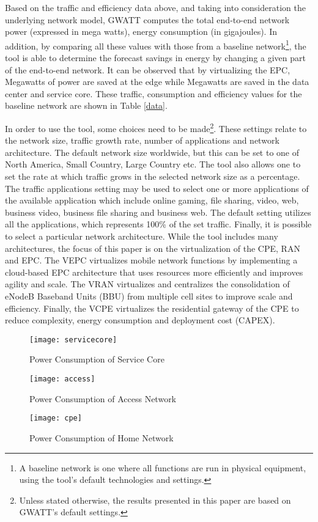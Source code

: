 \documentclass[conference]{IEEEtran}
\begin{document}
Based on the traffic and efficiency data above, and taking into consideration the underlying network model, GWATT computes the total end-to-end network power (expressed in mega watts), energy consumption (in gigajoules). In addition, by comparing all these values with those from a baseline network\footnote{A baseline network is one where all functions are run in physical equipment, using the tool's default technologies and settings.}, the tool is able to determine the forecast savings in energy by changing a given part of the end-to-end network. It can be observed that by virtualizing the EPC,  Megawatts of power are saved at the edge while  Megawatts are saved in the data center and service core. These traffic, consumption and efficiency values for the baseline network are shown in Table \ref{data}.

In order to use the tool, some choices need to be made\footnote{Unless stated otherwise, the results presented in this paper are based on GWATT's default settings.}. These settings relate to the network size, traffic growth rate, number of applications and network architecture. The default network size worldwide, but this can be set to one of North America, Small Country, Large Country etc. The tool also allows one to set the rate at which traffic grows in the selected network size as a percentage. The traffic applications setting may be used to select one or more applications of the available application which include online gaming, file sharing, video, web, business video, business file sharing and business web. The default setting utilizes all the applications, which represents 100\% of the set traffic. Finally, it is possible to select a particular network architecture. While the tool includes many architectures, the focus of this paper is on the virtualization of the CPE, RAN and EPC. The VEPC virtualizes mobile network functions by implementing a cloud-based EPC architecture that uses resources more efficiently and improves agility and scale. The VRAN virtualizes and centralizes the consolidation of eNodeB Baseband Units (BBU) from multiple cell sites to improve scale and efficiency. Finally, the VCPE virtualizes the residential gateway of the CPE to reduce complexity, energy consumption and deployment cost (CAPEX).

 \begin{figure*}[t]
\begin{minipage}{.33\textwidth}
\centering
\resizebox{.95\textwidth}{!}
{\texttt{[image: servicecore]}}
  \caption{Power Consumption of Service Core}
  \label{servicecore}
\end{minipage}
\begin{minipage}{.33\textwidth}
\centering
\resizebox{.95\textwidth}{!}
{\texttt{[image: access]}}
  \caption{Power Consumption of Access Network}
  \label{access}
\end{minipage}
\begin{minipage}{.33\textwidth}
\centering
\resizebox{.95\textwidth}{!}
{\texttt{[image: cpe]}}
  \caption{Power Consumption of Home Network}
  \label{cpe}
\end{minipage}
\end{figure*}
\end{document}
